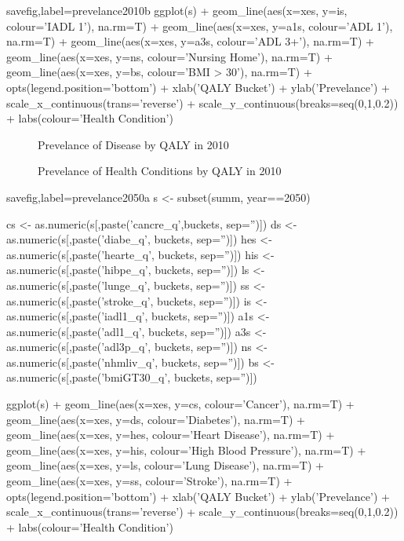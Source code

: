 \documentclass{article}
\begin{document}
\begin{Rcode}{savefig,label=prevelance2010b}
ggplot(s) +
geom_line(aes(x=xes, y=is, colour='IADL 1'), na.rm=T) +
geom_line(aes(x=xes, y=a1s, colour='ADL 1'), na.rm=T) +
geom_line(aes(x=xes, y=a3s, colour='ADL 3+'), na.rm=T) +
geom_line(aes(x=xes, y=ns, colour='Nursing Home'), na.rm=T) +
geom_line(aes(x=xes, y=bs, colour='BMI > 30'), na.rm=T) +
opts(legend.position='bottom') +
xlab('QALY Bucket') +
ylab('Prevelance') +
scale_x_continuous(trans='reverse') +
scale_y_continuous(breaks=seq(0,1,0.2)) +
labs(colour='Health Condition')
\end{Rcode}

\begin{figure}[ht]
\centering
{}
\caption{Prevelance of Disease by QALY in 2010}
\end{figure}

\begin{figure}[ht]
\centering
{}
\caption{Prevelance of Health Conditions by QALY in 2010}
\end{figure}

\begin{Rcode}{savefig,label=prevelance2050a}
s <- subset(summ, year==2050)

cs <- as.numeric(s[,paste('cancre_q',buckets, sep='')])
ds <- as.numeric(s[,paste('diabe_q', buckets, sep='')])
hes <- as.numeric(s[,paste('hearte_q', buckets, sep='')])
his <- as.numeric(s[,paste('hibpe_q', buckets, sep='')])
ls <- as.numeric(s[,paste('lunge_q', buckets, sep='')])
ss <- as.numeric(s[,paste('stroke_q', buckets, sep='')])
is <- as.numeric(s[,paste('iadl1_q', buckets, sep='')])
a1s <- as.numeric(s[,paste('adl1_q', buckets, sep='')])
a3s <- as.numeric(s[,paste('adl3p_q', buckets, sep='')])
ns <- as.numeric(s[,paste('nhmliv_q', buckets, sep='')])
bs <- as.numeric(s[,paste('bmiGT30_q', buckets, sep='')])

ggplot(s) +
geom_line(aes(x=xes, y=cs, colour='Cancer'), na.rm=T) +
geom_line(aes(x=xes, y=ds, colour='Diabetes'), na.rm=T) +
geom_line(aes(x=xes, y=hes, colour='Heart Disease'), na.rm=T) +
geom_line(aes(x=xes, y=his, colour='High Blood Pressure'), na.rm=T) +
geom_line(aes(x=xes, y=ls, colour='Lung Disease'), na.rm=T) +
geom_line(aes(x=xes, y=ss, colour='Stroke'), na.rm=T) +
opts(legend.position='bottom') +
xlab('QALY Bucket') +
ylab('Prevelance') +
scale_x_continuous(trans='reverse') +
scale_y_continuous(breaks=seq(0,1,0.2)) +
labs(colour='Health Condition')
\end{Rcode}
\end{document}
